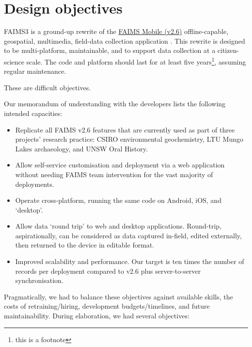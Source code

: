 \documentclass[a4paper,headings=small fontsize=10pt]{scrreprt}
\begin{document}


\tableofcontents


\chapter{Design objectives}

FAIMS3 is a ground-up rewrite of the
\href{https://github.com/FAIMS}{{FAIMS Mobile (v2.6)}} offline-capable,
geospatial, multimedia, field-data collection application
\autocite{Ballsun-Stanton2018-hq}. This rewrite is designed to be multi-platform, maintainable, and
to support data collection at a citizen-science scale. The code and
platform should last for at least five years\footnote{this is a footnote}, assuming regular
maintenance.

These are difficult objectives.

Our memorandum of understanding with the developers lists the following
intended capacities:

\begin{itemize}
\item Replicate all FAIMS v2.6 features that are currently used as part of
  three projects' research practice: CSIRO environmental geochemistry,
  LTU Mungo Lakes archaeology, and UNSW Oral History.
 
\item Allow self-service customisation and deployment via a web application
  without needing FAIMS team intervention for the vast majority of
  deployments.
 
\item Operate cross-platform, running the same code on Android, iOS, and
  `desktop'.
 
\item Allow data `round trip' to web and desktop applications. Round-trip,
  aspirationally, can be considered as data captured in-field, edited
  externally, then returned to the device in editable format.
 
\item Improved scalability and performance. Our target is ten times the
  number of records per deployment compared to v2.6 plus
  server-to-server synchronisation.
 
\end{itemize}

Pragmatically, we had to balance these objectives against available
skills, the costs of retraining/hiring, development budgets/timelines,
and future maintainability. During elaboration, we had several
objectives:
\end{document}
